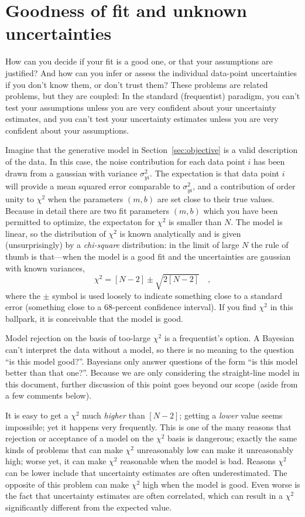 \documentclass[12pt,twoside]{article}
\newcommand{\documentname}{document}
\newcommand{\sectionname}{Section}
\newcounter{problem}
\begin{document}
\section{Goodness of fit and unknown uncertainties}\label{sec:goodness}

How can you decide if your fit is a good one, or that your assumptions
are justified?  And how can you infer or assess the individual
data-point uncertainties if you don't know them, or don't trust them?
These problems are related problems, but they are coupled: In the
standard (frequentist) paradigm, you can't test your assumptions
unless you are very confident about your uncertainty estimates, and
you can't test your uncertainty estimates unless you are very
confident about your assumptions.

Imagine that the generative model in \sectionname~\ref{sec:objective}
is a valid description of the data.  In this case, the noise
contribution for each data point $i$ has been drawn from a gaussian
with variance $\sigma_{yi}^2$.  The expectation is that data point $i$
will provide a mean squared error comparable to $\sigma_{yi}^2$, and a
contribution of order unity to $\chi^2$ when the parameters $(m,b)$
are set close to their true values.  Because in detail there are two
fit parameters $(m,b)$ which you have been permitted to optimize, the
expectaton for $\chi^2$ is smaller than $N$. The model is linear, so
the distribution of $\chi^2$ is known analytically and is given
(unsurprisingly) by a \emph{chi-square} distribution: in the limit of
large $N$ the rule of thumb is that---when the model is a good fit and
the uncertainties are gaussian with known variances,
\begin{equation}
\chi^2 = [N-2] \pm \sqrt{2[N-2]} \quad ,
\end{equation}
where the $\pm$ symbol is used loosely to indicate something close to
a standard error (something close to a 68-percent confidence
interval).  If you find $\chi^2$ in this ballpark, it is conceivable
that the model is good.

Model rejection on the basis of too-large $\chi^2$ is a frequentist's
option.  A Bayesian can't interpret the data without a model, so there
is no meaning to the question ``is this model good?''.  Bayesians only
answer questions of the form ``is this model better than that one?''.
Because we are only considering the straight-line model in this
\documentname, further discussion of this point goes beyond our scope
(aside from a few comments below).

It is easy to get a $\chi^2$ much \emph{higher} than $[N-2]$; getting
a \emph{lower} value seems impossible; yet it happens very frequently.
This is one of the many reasons that rejection or acceptance of a
model on the $\chi^2$ basis is dangerous; exactly the same kinds of
problems that can make $\chi^2$ unreasonably low can make it
unreasonably high; worse yet, it can make $\chi^2$ reasonable when the
model is bad.  Reasons $\chi^2$ can be lower include that uncertainty
estimates are often underestimated. The opposite of this problem can
make $\chi^2$ high when the model is good. Even worse is the fact that
uncertainty estimates are often correlated, which can result in a
$\chi^2$ significantly different from the expected value.
\end{document}
